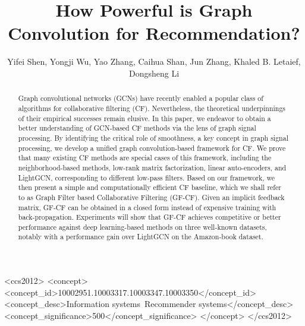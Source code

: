 \documentclass[sigconf]{acmart}
\begin{document}
\fancyhead{}
\title{How Powerful is Graph Convolution for Recommendation?}
 \author{Yifei Shen, Yongji Wu, Yao Zhang, Caihua Shan, Jun Zhang, Khaled B. Letaief, Dongsheng Li
 }




\begin{abstract}
  Graph convolutional networks (GCNs) have recently enabled a popular class of algorithms for collaborative filtering (CF). Nevertheless, the theoretical underpinnings of their empirical successes remain elusive. In this paper, we endeavor to obtain a better understanding of GCN-based CF methods via the lens of graph signal processing. By identifying the critical role of smoothness, a key concept in graph signal processing, we develop a unified graph convolution-based framework for CF. We prove that many existing CF methods are special cases of this framework, including the neighborhood-based methods, low-rank matrix factorization, linear auto-encoders, and LightGCN, corresponding to different low-pass filters. Based on our framework, we then present a simple and computationally efficient CF baseline, which we shall refer to as Graph Filter based Collaborative Filtering (GF-CF). Given an implicit feedback matrix, GF-CF can be obtained in a closed form instead of expensive training with back-propagation. Experiments will show that GF-CF achieves competitive or better performance against deep learning-based methods on three well-known datasets, notably with a  performance gain over LightGCN on the Amazon-book dataset.
\end{abstract}

\begin{CCSXML}
<ccs2012>
   <concept>
       <concept_id>10002951.10003317.10003347.10003350</concept_id>
       <concept_desc>Information systems~Recommender systems</concept_desc>
       <concept_significance>500</concept_significance>
       </concept>
 </ccs2012>
\end{CCSXML}


\end{document}
